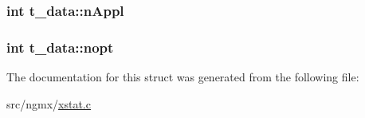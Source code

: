 \hypertarget{structt__data_afb46df65d1cfc7fed2f8248047cda71a}{
\subsubsection[{n\-Appl}]{\setlength{\rightskip}{0pt plus 5cm}int {\bf t\-\_\-data\-::n\-Appl}}}\label{structt__data_afb46df65d1cfc7fed2f8248047cda71a}
\hypertarget{structt__data_ab10ce01574cfa4d14c85be018d2cb25b}{
\subsubsection[{nopt}]{\setlength{\rightskip}{0pt plus 5cm}int {\bf t\-\_\-data\-::nopt}}}\label{structt__data_ab10ce01574cfa4d14c85be018d2cb25b}


\-The documentation for this struct was generated from the following file\-:\begin{DoxyCompactItemize}
\item 
src/ngmx/\hyperlink{xstat_8c}{xstat.\-c}\end{DoxyCompactItemize}
